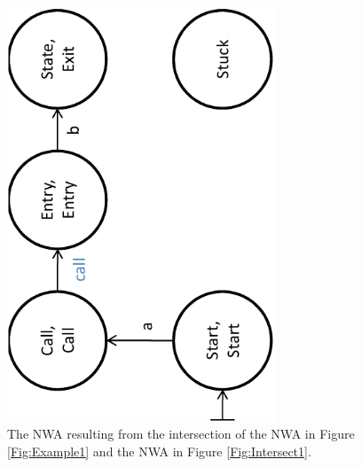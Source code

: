 \documentclass{llncs}
\begin{document}
\begin{figure}[htbp]
  \centering
    \includegraphics[width=8cm]{Figures/Figure6}
  \caption{The NWA resulting from the intersection of the NWA in Figure \ref{Fig:Example1} and the NWA in Figure \ref{Fig:Intersect1}.}
  \label{Fig:Intersect2}
\end{figure}
\end{document}
